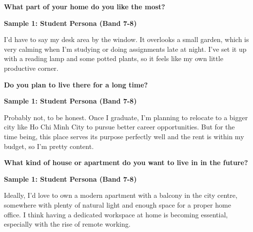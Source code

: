 \separator

\begin{ieltsquestion}
\textbf{What part of your home do you like the most?}
\end{ieltsquestion}
\textbf{Sample 1: Student Persona (Band 7-8)}

I'd have to say my desk area by the window. It overlooks a small garden, which is very calming when I'm studying or doing assignments late at night. I've set it up with a reading lamp and some potted plants, so it feels like my own little productive corner.

\separator

\begin{ieltsquestion}
\textbf{Do you plan to live there for a long time?}
\end{ieltsquestion}
\textbf{Sample 1: Student Persona (Band 7-8)}

Probably not, to be honest. Once I graduate, I'm planning to relocate to a bigger city like Ho Chi Minh City to pursue better career opportunities. But for the time being, this place serves its purpose perfectly well and the rent is within my budget, so I'm pretty content.

\separator

\begin{ieltsquestion}
\textbf{What kind of house or apartment do you want to live in in the future?}
\end{ieltsquestion}
\textbf{Sample 1: Student Persona (Band 7-8)}

Ideally, I'd love to own a modern apartment with a balcony in the city centre, somewhere with plenty of natural light and enough space for a proper home office. I think having a dedicated workspace at home is becoming essential, especially with the rise of remote working.

\separator


